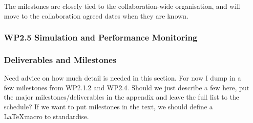 The milestones are closely tied to the collaboration-wide
organisation, and will move to the collaboration agreed dates when
they are known.

\subsubsection{WP2.5 Simulation and Performance Monitoring}

\subsubsection{Deliverables and Milestones}

Need advice on how much detail is needed in this section.  For now I dump in a few milestones from WP2.1.2 and WP2.4.  Should we just describe a few here, put the major milestones/deliverables in the appendix and leave the full list to the schedule?  If we want to put milestones in the text, we should define a \LaTeX macro to standardise.

